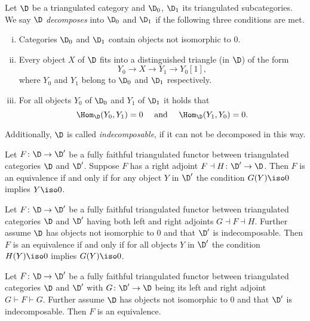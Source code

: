\begin{definition}
    Let $\D$ be a triangulated category and $\D_0$, $\D_1$ its triangulated subcategories. We say $\D$ \emph{decomposes} into $\D_0$ and $\D_1$ if the following three conditions are met.
    \begin{enumerate}[(i)]
        \item Categories $\D_0$ and $\D_1$ contain objects not isomorphic to $0$.
        \item Every object $X$ of $\D$ fits into a distinguished triangle (in $\D$) of the form
        \[
            Y_0 \to X \to Y_1 \to Y_0[1],
        \]
        where $Y_0$ and $Y_1$ belong to $\D_0$ and $\D_1$ respectively.
        \item For all objects $Y_0$ of $\D_0$ and $Y_1$ of $\D_1$ it holds that
        \[
            \Hom_\D(Y_0, Y_1) = 0 \quad \text{ and } \quad \Hom_\D(Y_1, Y_0) = 0.
        \]
    \end{enumerate} 
    Additionally, $\D$ is called \emph{indecomposable}, if it can not be decomposed in this way.
\end{definition}

\begin{lemma}
    Let $F \colon \D \to \D'$ be a fully faithful triangulated functor between triangulated categories $\D$ and $\D'$. Suppose $F$ has a right adjoint $F \dashv H \colon \D' \to \D$. Then $F$ is an equivalence if and only if for any object $Y$ in $\D'$ the condition $G(Y) \iso 0$ implies $Y \iso 0$.
\end{lemma}

\begin{proposition}
    Let $F \colon \D \to \D'$ be a fully faithful triangulated functor between triangulated categories $\D$ and $\D'$ having both left and right adjoints $G \dashv F \dashv H$. Further assume $\D$ has objects not isomorphic to $0$ and that $\D'$ is indecomposable. Then $F$ is an equivalence if and only if for all objects $Y$ in $\D'$ the condition $H(Y) \iso 0$ implies $G(Y) \iso 0$. 
\end{proposition}

\begin{corollary}
    \label{condition for functor to be an equivalence}
    Let $F \colon \D \to \D'$ be a fully faithful triangulated functor between triangulated categories $\D$ and $\D'$ with $G \colon \D' \to \D$ being its left and right adjoint $G \vdash F \vdash G$. Further assume $\D$ has objects not isomorphic to $0$ and that $\D'$ is indecomposable. Then $F$ is an equivalence.
\end{corollary}

